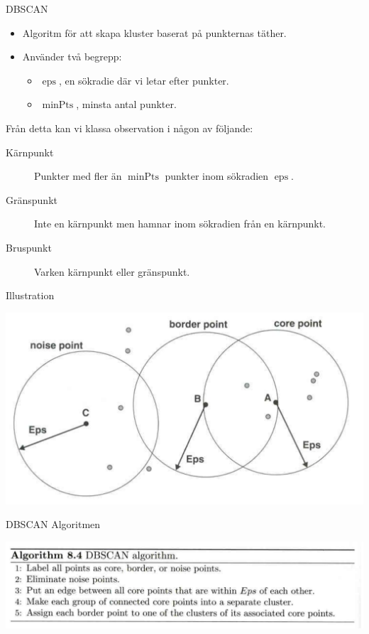 \documentclass[10pt,english]{beamer}
\begin{document}
\begin{frame}{DBSCAN}

    \begin{itemize}
        \item Algoritm för att skapa kluster baserat på punkternas täther.
        \item Använder två begrepp:
        \begin{itemize}
            \item $\operatorname{eps}$, en sökradie där vi letar efter punkter.
            \item $\operatorname{minPts}$, minsta antal punkter.
        \end{itemize}
    \end{itemize}
    
    Från detta kan vi klassa observation i någon av följande:
    \begin{description}
        \item[Kärnpunkt] Punkter med fler än $\operatorname{minPts}$ punkter inom sökradien $\operatorname{eps}$.
        \item[Gränspunkt] Inte en kärnpunkt men hamnar inom sökradien från en kärnpunkt.
        \item[Bruspunkt] Varken kärnpunkt eller gränspunkt.   
    \end{description}

\end{frame}

\begin{frame}{Illustration}
    
    \includegraphics[width=\textwidth]{figs/DBSCAN_obs_class.png}

\end{frame}

\begin{frame}{DBSCAN Algoritmen}

    \includegraphics[width=\textwidth]{figs/DBSCAN algoritm.png}
    
\end{frame}
\end{document}

